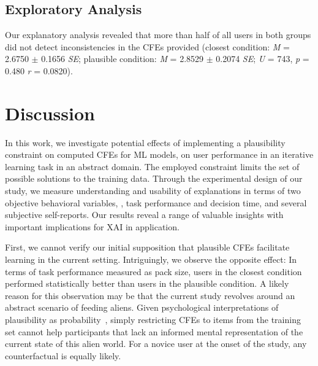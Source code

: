 {\subsection{Exploratory Analysis}
Our explanatory analysis revealed that more than half of all users in both groups did not detect inconsistencies in the \glspl{CFE} provided (closest condition: \textit{M} = 2.6750 $\pm$ 0.1656 \textit{SE}; plausible condition: \textit{M} = 2.8529 $\pm$ 0.2074 \textit{SE}; \textit{U} = 743, \textit{p} = 0.480 \textit{r} = 0.0820).

\section{Discussion}\label{sec:discussion}

In this work, we investigate potential effects of implementing a plausibility constraint on computed \glspl{CFE} for \gls{ML} models, on user performance in an iterative learning task in an abstract domain. 
The employed constraint limits the set of possible solutions to the training data.
Through the experimental design of our study, we measure understanding and usability of explanations in terms of two objective behavioral variables, \ie, task performance and decision time, and several subjective self-reports. 
Our results reveal a range of valuable insights with important implications for \gls{XAI} in application.

First, we cannot verify our initial supposition that plausible \glspl{CFE} facilitate learning in the current setting. 
Intriguingly, we observe the opposite effect: In terms of task performance measured as pack size, users in the closest condition performed statistically better than users in the plausible condition.
A likely reason for this observation may be that the current study revolves around an abstract scenario of feeding aliens. 
Given psychological interpretations of plausibility as probability~\citep{pezdek_is_2006, de_brigard_remembering_2013}, simply restricting \glspl{CFE} to items from the training set cannot help participants that lack an informed mental representation of the current state of this alien world. 
For a novice user at the onset of the study, any counterfactual is equally likely.

}
